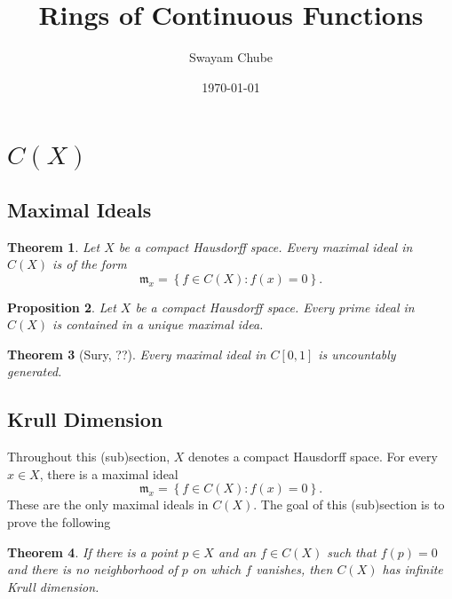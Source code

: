 \documentclass[12pt]{article}
\title{Rings of Continuous Functions}
\author{Swayam Chube}
\date{\today}
\theoremstyle{thmstyle}
\newtheorem{theorem}{Theorem}[section]
\newtheorem{proposition}[theorem]{Proposition}
\theoremstyle{defstyle}
\newcommand{\frakm}{\mathfrak{m}} %
\begin{document}
\maketitle

\section{\texorpdfstring{$C(X)$}{C(X)}}

\subsection{Maximal Ideals}

\begin{theorem}
    Let $X$ be a compact Hausdorff space. Every maximal ideal in $C(X)$ is of the form 
    \begin{equation*}
        \frakm_x = \left\{f\in C(X)\colon f(x) = 0\right\}.
    \end{equation*}
\end{theorem}

\begin{proposition}
    Let $X$ be a compact Hausdorff space. Every prime ideal in $C(X)$ is contained in a unique maximal idea.
\end{proposition}

\begin{theorem}[Sury, ??]
    Every maximal ideal in $C[0, 1]$ is uncountably generated.
\end{theorem}

\subsection{Krull Dimension}

Throughout this (sub)section, $X$ denotes a compact Hausdorff space. For every $x\in X$, there is a maximal ideal 
\begin{equation*}
    \frakm_x = \left\{f\in C(X)\colon f(x) = 0\right\}.
\end{equation*}
These are the only maximal ideals in $C(X)$. The goal of this (sub)section is to prove the following 

\begin{theorem}
    If there is a point $p\in X$ and an $f\in C(X)$ such that $f(p) = 0$ and there is no neighborhood of $p$ on which $f$ vanishes, then $C(X)$ has infinite Krull dimension.
\end{theorem}
\end{document}
